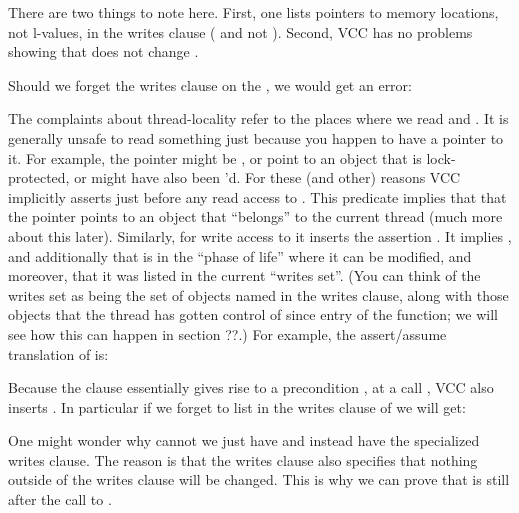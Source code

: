 There are two things to note here.
First, one lists pointers to memory locations, not l-values, in the writes
clause (\ie {} and not ).
Second, VCC has no problems showing that  does not change
.

Should we forget the writes clause on the , we would get an error:


\noindent
{}
The complaints about thread-locality refer to the places where we
read  and .
It is generally unsafe to read something just because you happen to have a pointer to it.
For example, the pointer might be , or point to an object
that is lock-protected, or might have also been 'd.
For these (and other) reasons VCC implicitly asserts
 just before any read access to .
This predicate implies that that the pointer points to an object that
``belongs'' to the current thread (much more about this later).
Similarly, for write access to  it inserts the assertion
.
It implies ,
and additionally that  is in the ``phase of life'' where
it can be modified, and moreover, that it was listed in the current
``writes set''. (You can think of the writes set as being the set
of objects named in the writes clause, along with those objects that
the thread has gotten control of since entry of the function; we will
see how this can happen in section ??.)
For example, the assert/assume translation of  is:


\noindent
Because the clause  essentially gives rise to a precondition
, at a call  ,
VCC also inserts .
In particular if we forget to list  in the writes
clause of  we will get:


One might wonder why cannot we just have 
 and instead have the specialized writes clause.
The reason is that the writes clause also specifies that nothing
outside of the writes clause will be changed.
This is why we can prove that  is still  after the call
to . 




